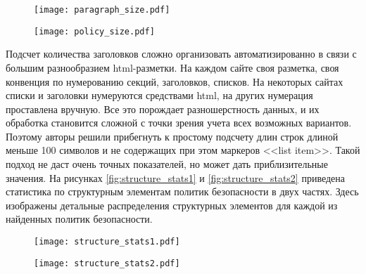 \documentclass[../main]{subfiles}
\begin{document}
\begin{figure}[H]
    \centering
    {\texttt{[image: paragraph\_size.pdf]}}
    \vspace{-\baselineskip}
\end{figure}

\begin{figure}[H]
    \centering
    {\texttt{[image: policy\_size.pdf]}}
    \vspace{-\baselineskip}
\end{figure}

Подсчет количества заголовков сложно организовать автоматизированно в связи с большим разнообразием html-разметки. На каждом сайте своя разметка, своя конвенция по нумерованию секций, заголовков, списков. На некоторых сайтах списки и заголовки нумеруются средствами html, на других нумерация проставлена вручную. Все это порождает разношерстность данных, и их обработка становится сложной с точки зрения учета всех возможных вариантов. Поэтому авторы решили прибегнуть к простому подсчету длин строк длиной меньше 100 символов и не содержащих при этом маркеров <<{list item}>>. Такой подход не даст очень точных показателей, но может дать приблизительные значения. На рисунках \ref{fig:structure_stats1} и \ref{fig:structure_stats2} приведена статистика по структурным элементам политик безопасности в двух частях. Здесь изображены детальные распределения структурных элементов для каждой из найденных политик безопасности.

\begin{figure}[H]
    \centering
    {\texttt{[image: structure\_stats1.pdf]}}
    \vspace{-\baselineskip}
\end{figure}

\begin{figure}[H]
    \centering
    {\texttt{[image: structure\_stats2.pdf]}}
    \vspace{-\baselineskip}
\end{figure}
\end{document}
